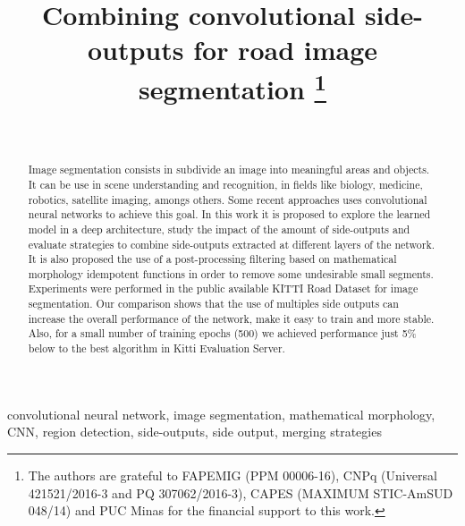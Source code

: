 \documentclass[conference]{IEEEtran}
\begin{document}
\title{Combining convolutional side-outputs for road image segmentation
\thanks{The authors are grateful to FAPEMIG (PPM 00006-16), CNPq (Universal 421521/2016-3 and PQ 307062/2016-3), CAPES (MAXIMUM STIC-AmSUD 048/14) and PUC Minas for the financial support to this work.}
}

\author{
\\
}

\maketitle

\begin{abstract}
Image segmentation consists in subdivide an image into meaningful areas and objects. It can be use in scene understanding and recognition, in fields like biology, medicine, robotics, satellite imaging, amongs others. Some recent approaches uses convolutional neural networks to achieve this goal. In this work it is proposed to explore the learned model in a deep architecture, study the impact of the amount of side-outputs and evaluate strategies to combine side-outputs extracted at different layers of the network. It is also proposed the use of a post-processing filtering based on mathematical morphology idempotent functions in order to remove some undesirable small segments. Experiments were performed in the public available KITTI Road Dataset for image segmentation. Our comparison shows that the use of multiples side outputs can increase the overall performance of the network, make it easy to train and more stable. Also, for a small number of training epochs (500) we achieved performance just 5\% below to the best algorithm in Kitti Evaluation Server.
\end{abstract}


\begin{IEEEkeywords}
convolutional neural network, image segmentation, mathematical morphology, CNN, region detection, side-outputs, side output, merging strategies
\end{IEEEkeywords}


%







\end{document}

